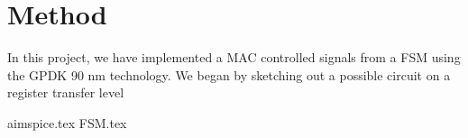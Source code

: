 \section{Method}
In this project, we have implemented a MAC controlled signals from a FSM using the GPDK 90 nm technology. We began by sketching out a possible circuit on a register transfer level



{aimspice.tex}
{FSM.tex}